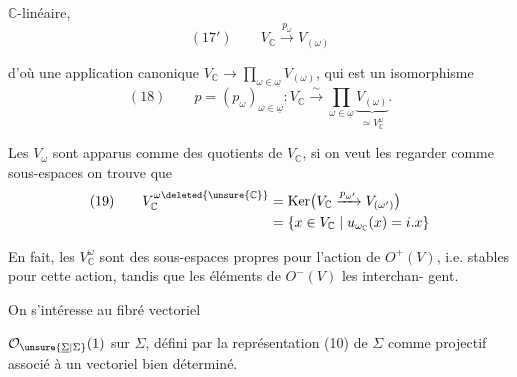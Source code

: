 

$\mathbb C$-linéaire, 
\[
(17')\qquad V_{\mathbb C}\xrightarrow{p_\omega}V_{(\omega)}
\]

d’où une application  canonique
$V_{\mathbb C}\longrightarrow\prod_{\omega\in\underline\omega}V_{(\omega)}$,
qui est un isomorphisme
\[
(18)\qquad p=(p_\omega)_{\omega\in\underline\omega}:
V_{\mathbb C}\xrightarrow{\sim}\prod_{\omega\in\underline\omega}
\underbrace{V_{(\omega)}}_{\simeq V_{\mathbb C}^{\omega}}.
\]

Les $V_{\omega}$ sont apparus comme
des quotients de $V_{\mathbb C}$, si on veut les
regarder comme sous-espaces on trouve
que
\[
\begin{aligned}
(19)\qquad V_{\mathbb C}^{\omega\deleted{\unsure{\mathbb C}}}
&=\operatorname{Ker}\bigl(V_{\mathbb C}\xrightarrow{p_{\omega'}}V_{(\omega')}\bigr)\\
&=\{x\in V_{\mathbb C}\mid u_{\omega_{\mathbb C}}(x)=i.x\}
\end{aligned}
\]

En fait, les $V_{\mathbb C}^{\omega}$\inserted{$(\omega\in\underline\omega)$} sont des sous-espaces
propres pour l’action de $O^+(V)$, i.e.
stables pour cette action, tandis que
les éléments de $O^-(V)$ les interchan-
gent.

On s’intéresse au fibré vectoriel


$\mathcal O_{\unsure{\underline\Sigma|\Sigma}}(1)$ sur $\Sigma$, défini par la représentation (10) de $\Sigma$ comme   projectif associé à un vectoriel bien déterminé.

